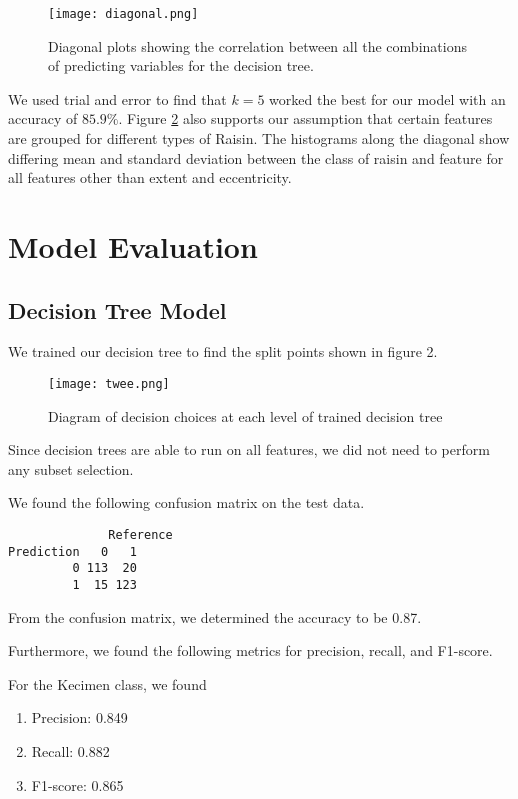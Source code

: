 \documentclass{article}
\begin{document}
\begin{figure}[h]
    \centering
    \texttt{[image: diagonal.png]}
    \caption{Diagonal plots showing the correlation between all the combinations of predicting variables for the decision tree.}
    \label{fig:enter-label}
\end{figure}

We used trial and error to find that $k = 5$ worked the best for our model with an accuracy of $85.9\%$. Figure \ref{fig:enter-label} also supports our assumption that certain features are grouped for different types of Raisin. The histograms along the diagonal show differing mean and standard deviation between the class of raisin and feature for all features other than extent and eccentricity. 


\newpage
\section{Model Evaluation}

\subsection{Decision Tree Model}
We trained our decision tree to find the split points shown in figure 2.

\begin{figure}[h]
    \centering
    \texttt{[image: twee.png]}
    \caption{Diagram of decision choices at each level of trained decision tree}
    \label{fig:enter-label}
\end{figure}

Since decision trees are able to run on all features, we did not need to perform any subset selection.

We found the following confusion matrix on the test data.

\begin{verbatim}
              Reference
Prediction   0   1
         0 113  20
         1  15 123
\end{verbatim}

From the confusion matrix, we determined the accuracy to be 0.87.

Furthermore, we found the following metrics for precision, recall, and F1-score.

For the Kecimen class, we found

\begin{enumerate}
    \item Precision: 0.849

    \item Recall: 0.882

    \item F1-score: 0.865
\end{enumerate}
\end{document}
